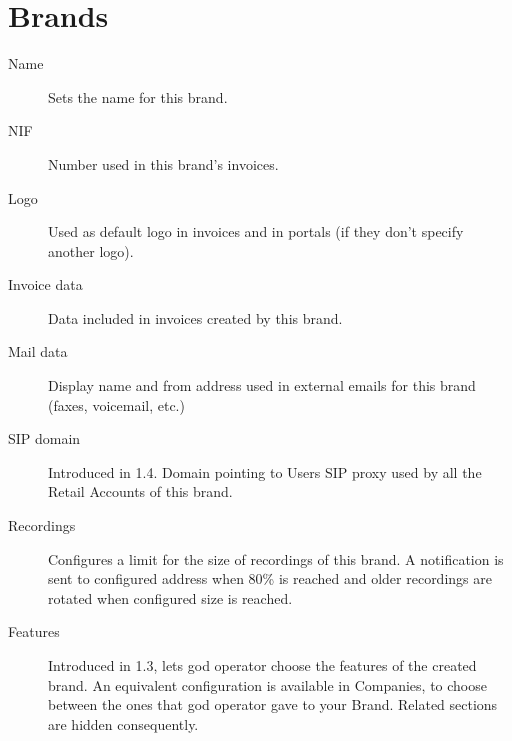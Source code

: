 \documentclass[letterpaper,10pt,english]{sphinxmanual}
\begin{document}
\section{Brands}
\label{platform/brands:brands}\label{platform/brands::doc}\begin{description}
\item[{Name}] \leavevmode{}\label{platform/brands:term-name}
Sets the name for this brand.

\item[{NIF}] \leavevmode{}\label{platform/brands:term-nif}
Number used in this brand's invoices.

\item[{Logo}] \leavevmode{}\label{platform/brands:term-logo}
Used as default logo in invoices and in portals (if they don't specify
another logo).

\item[{Invoice data}] \leavevmode{}\label{platform/brands:term-invoice-data}
Data included in invoices created by this brand.

\item[{Mail data}] \leavevmode{}\label{platform/brands:term-mail-data}
Display name and from address used in external emails for this brand
(faxes, voicemail, etc.)

\item[{SIP domain}] \leavevmode{}\label{platform/brands:term-sip-domain}
Introduced in 1.4. Domain pointing to Users SIP proxy used by all the
Retail Accounts of this brand.

\item[{Recordings}] \leavevmode{}\label{platform/brands:term-recordings}
Configures a limit for the size of recordings of this brand. A
notification is sent to configured address when 80\% is reached and
older recordings are rotated when configured size is reached.

\item[{Features}] \leavevmode{}\label{platform/brands:term-features}
Introduced in 1.3, lets god operator choose the features of the created
brand. An equivalent configuration is available in Companies, to choose
between the ones that god operator gave to your Brand. Related sections
are hidden consequently.

\end{description}
\end{document}
